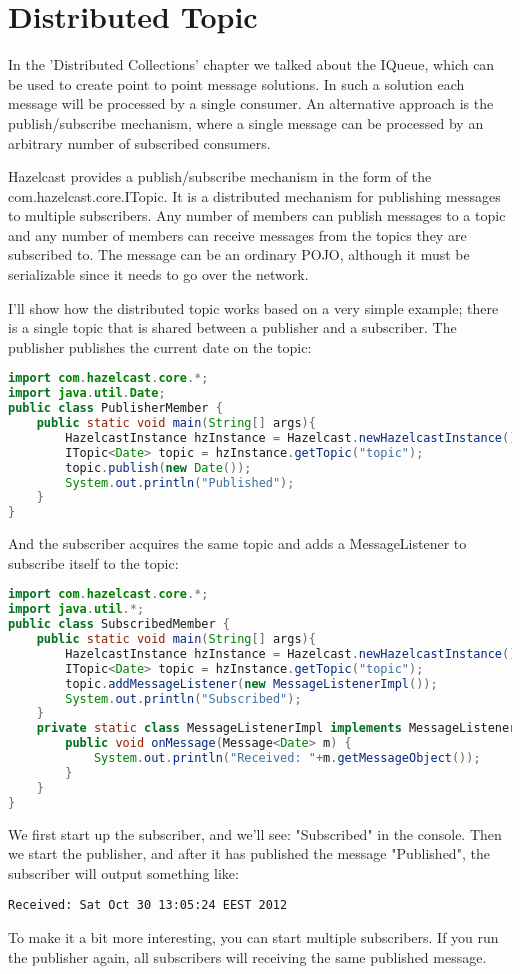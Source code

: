 \chapter{Distributed Topic}
In the 'Distributed Collections' chapter we talked about the IQueue, which can be used to create point to point message solutions. In such a solution each message will be processed by a single consumer. An alternative approach is the publish/subscribe mechanism, where a single message can be processed by an arbitrary number of subscribed consumers.

Hazelcast provides a publish/subscribe mechanism in the form of the com.hazelcast.core.ITopic. It is a distributed mechanism for publishing messages to multiple subscribers. Any number of members can publish messages to a topic and any number of members can receive messages from the topics they are subscribed to. The message can be an ordinary POJO, although it must be serializable since it needs to go over the network.

I'll show how the distributed topic works based on a very simple example; there is a single topic that is shared between a publisher and a subscriber. The publisher publishes the current date on the topic:
\begin{lstlisting}[language=java]
import com.hazelcast.core.*;
import java.util.Date;
public class PublisherMember {
    public static void main(String[] args){
        HazelcastInstance hzInstance = Hazelcast.newHazelcastInstance();
        ITopic<Date> topic = hzInstance.getTopic("topic");
        topic.publish(new Date());
        System.out.println("Published");
    }
}
\end{lstlisting}
And the subscriber acquires the same topic and adds a MessageListener to subscribe itself to the topic:
\begin{lstlisting}[language=java]
import com.hazelcast.core.*;
import java.util.*;
public class SubscribedMember {
    public static void main(String[] args){
        HazelcastInstance hzInstance = Hazelcast.newHazelcastInstance();
        ITopic<Date> topic = hzInstance.getTopic("topic");
        topic.addMessageListener(new MessageListenerImpl());
        System.out.println("Subscribed");
    }
    private static class MessageListenerImpl implements MessageListener<Date> {
        public void onMessage(Message<Date> m) {
            System.out.println("Received: "+m.getMessageObject());
        }
    }
}
\end{lstlisting}
We first start up the subscriber, and we'll see: "Subscribed" in the console. Then we start the publisher, and after it has published the message "Published", the subscriber will output something like:
\begin{lstlisting}
Received: Sat Oct 30 13:05:24 EEST 2012
\end{lstlisting}
To make it a bit more interesting, you can start multiple subscribers. If you run the publisher again, all subscribers will receiving the same published message.

